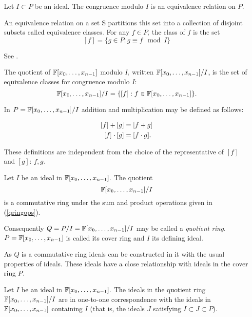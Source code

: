 \begin{proposition}
Let $I \subset P$ be an ideal. The congruence modulo $I$ is an equivalence relation on $P$.
\end{proposition}

An equivalence relation on a set S partitions this set into a collection of disjoint subsets called equivalence classes. For any $f \in P$, the class of $f$ is the set
\[
 [f] = \{ g \in P : g \equiv f \mod I \}
\]



\begin{citeproof}
See \cite[p.219]{Cox2005}.
\end{citeproof}

\begin{definition}
The quotient of $\mathbb{F}[x_0,\dots,x_{n-1}]$ modulo $I$, written $\mathbb{F}[x_0,\dots,x_{n-1}]/I$, is the set of equivalence classes for congruence modulo $I$:
\[
 \mathbb{F}[x_0,\dots,x_{n-1}]/I = \{[f] : f \in \mathbb{F}[x_0,\dots,x_{n-1}]\}.
\]
\end{definition}

In $P=\mathbb{F}[x_0,\dots,x_{n-1}]/I$  addition and multiplication may be defined as follows:

\begin{align}
\label{qringops}
[f] + [g] &= [f + g]\\
[f] \cdot [g] &= [f \cdot g]. \notag
\end{align}

These definitions are independent from the choice of the representative of $[f]$ and $[g]$: $f,g$. 

\begin{theorem}{\cite[p.221]{Cox2005}}
Let $I$ be an ideal in $\mathbb{F}[x_0, \dots, x_{n-1}]$. The quotient \[\mathbb{F}[x_0,\dots,x_{n-1}]/I\] is a commutative ring under the
sum and product operations given in (\ref{qringops}).
\end{theorem}

Consequently $Q = P/I = \mathbb{F}[x_0,\dots,x_{n-1}]/I$ may be called a \emph{quotient ring}. 
$P=\mathbb{F}[x_0,\dots,x_{n-1}]$ is called its cover ring and $I$ its defining ideal.

As $Q$ is a commutative ring ideals can be constructed in it with the usual properties of ideals. These ideals have a close relationship with ideals in the cover ring $P$.

\begin{theorem}{\cite[p.223]{Cox2005}}
Let $I$ be an ideal in $\mathbb{F}[x_0,\dots,x_{n-1}]$. The ideals in the quotient ring $\mathbb{F}[x_0,\dots,x_{n-1}]/I$ are in one-to-one
correspondence with the ideals in $\mathbb{F}[x_0,\dots,x_{n-1}]$ containing $I$ (that is, the ideals $J$ satisfying $I \subset J
\subset P$).
\end{theorem}

